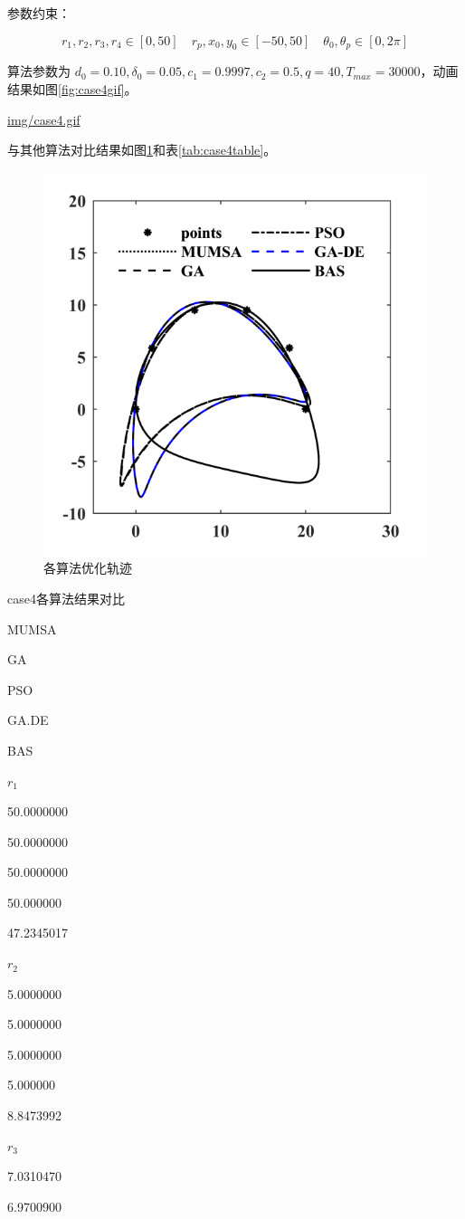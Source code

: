 \documentclass[]{ctexbook}
\theoremstyle{definition}
\theoremstyle{definition}
\theoremstyle{definition}
\theoremstyle{remark}
\begin{document}
参数约束：

\[
r_1,r_2,r_3,r_4\in[0,50]\quad r_p,x_0,y_0\in[-50,50]\quad \theta_0,\theta_p\in[0,2\pi]
\]

算法参数为
\(d_0 = 0.10,\delta_0=0.05,c_1=0.9997,c_2=0.5,q=40,T_{max}=30000\)，动画结果如图\ref{fig:case4gif}。

\url{img/case4.gif}

与其他算法对比结果如图\ref{fig:case4png}和表\ref{tab:case4table}。

\begin{figure}

{\centering \includegraphics[width=0.5\linewidth]{img/case4png} 

}

\caption{各算法优化轨迹}\label{fig:case4png}
\end{figure}

\label{tab:case4table}case4各算法结果对比

MUMSA

GA

PSO

GA.DE

BAS

\(r_1\)

50.0000000

50.0000000

50.0000000

50.000000

47.2345017

\(r_2\)

5.0000000

5.0000000

5.0000000

5.000000

8.8473992

\(r_3\)

7.0310470

6.9700900
\end{document}
